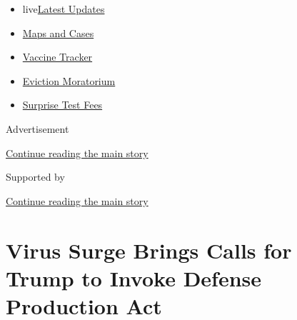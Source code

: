 \begin{itemize}
\tightlist
\item
  live\href{https://www.nytimes3xbfgragh.onion/2020/09/09/world/covid-19-coronavirus.html?name=styln-coronavirus-national\&region=TOP_BANNER\&block=storyline_menu_recirc\&action=click\&pgtype=Article\&impression_id=639ba5a0-f2c7-11ea-afab-d96c7c69d660\&variant=undefined}{Latest
  Updates}
\item
  \href{https://www.nytimes3xbfgragh.onion/interactive/2020/us/coronavirus-us-cases.html?name=styln-coronavirus-national\&region=TOP_BANNER\&block=storyline_menu_recirc\&action=click\&pgtype=Article\&impression_id=639ba5a1-f2c7-11ea-afab-d96c7c69d660\&variant=undefined}{Maps
  and Cases}
\item
  \href{https://www.nytimes3xbfgragh.onion/interactive/2020/science/coronavirus-vaccine-tracker.html?name=styln-coronavirus-national\&region=TOP_BANNER\&block=storyline_menu_recirc\&action=click\&pgtype=Article\&impression_id=639ba5a2-f2c7-11ea-afab-d96c7c69d660\&variant=undefined}{Vaccine
  Tracker}
\item
  \href{https://www.nytimes3xbfgragh.onion/2020/09/02/your-money/eviction-moratorium-covid.html?name=styln-coronavirus-national\&region=TOP_BANNER\&block=storyline_menu_recirc\&action=click\&pgtype=Article\&impression_id=639ba5a3-f2c7-11ea-afab-d96c7c69d660\&variant=undefined}{Eviction
  Moratorium}
\item
  \href{https://www.nytimes3xbfgragh.onion/2020/09/09/upshot/coronavirus-surprise-test-fees.html?name=styln-coronavirus-national\&region=TOP_BANNER\&block=storyline_menu_recirc\&action=click\&pgtype=Article\&impression_id=639ba5a4-f2c7-11ea-afab-d96c7c69d660\&variant=undefined}{Surprise
  Test Fees}
\end{itemize}

Advertisement

\protect\hyperlink{after-top}{Continue reading the main story}

Supported by

\protect\hyperlink{after-sponsor}{Continue reading the main story}

\hypertarget{virus-surge-brings-calls-for-trump-to-invoke-defense-production-act}{%
\section{Virus Surge Brings Calls for Trump to Invoke Defense Production
Act}\label{virus-surge-brings-calls-for-trump-to-invoke-defense-production-act}}

